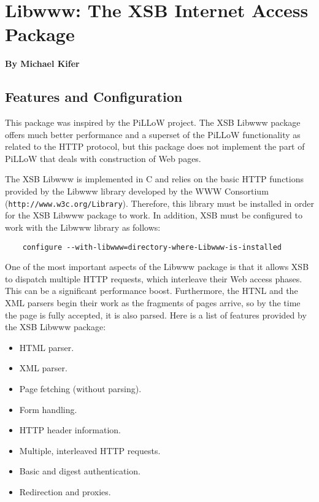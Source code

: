 \chapter{Libwww: The XSB Internet Access Package}
\label{chap-libwww}

\begin{center}
{\Large {\bf By Michael Kifer}}
\end{center}


\section{Features and Configuration}
This package was inspired by the PiLLoW project.
The XSB Libwww package offers much better performance and a superset of the
PiLLoW functionality as related to the HTTP protocol, but this package does
not implement the part of PiLLoW that deals with construction of Web pages.

The XSB Libwww is implemented in C and relies on the basic HTTP functions
provided by the Libwww library developed by the WWW Consortium
(\verb|http://www.w3c.org/Library|). Therefore, this library must be
installed in order for the XSB Libwww package to work. In addition, XSB
must be configured to work with the Libwww library as follows:
\begin{verbatim}
    configure --with-libwww=directory-where-Libwww-is-installed  
\end{verbatim}

One of the most important aspects of the Libwww package is that it allows
XSB to dispatch multiple HTTP requests, which interleave their Web access
phases. This can be a significant performance boost. Furthermore, the HTNL
and the XML parsers begin their work as the fragments of pages arrive, so
by the time the page is fully accepted, it is also parsed. Here is a list
of features provided by the XSB Libwww package:
\begin{itemize}
  \item  HTML parser.
  \item  XML parser.
  \item  Page fetching (without parsing).
  \item  Form handling.
  \item  HTTP header information.
  \item  Multiple, interleaved HTTP requests.
  \item  Basic and digest authentication.
  \item  Redirection and proxies.
\end{itemize}

